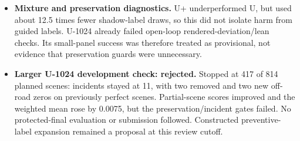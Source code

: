\begin{itemize}
\item \textbf{Mixture and preservation diagnostics.} U+ underperformed U, but used about 12.5 times fewer shadow-label draws, so this did not isolate harm from guided labels. U-1024 already failed open-loop rendered-deviation/lean checks. Its small-panel success was therefore treated as provisional, not evidence that preservation guards were unnecessary.
\item \textbf{Larger U-1024 development check: rejected.} Stopped at 417 of 814 planned scenes: incidents stayed at 11, with two removed and two new off-road zeros on previously perfect scenes. Partial-scene scores improved and the weighted mean rose by 0.0075, but the preservation/incident gates failed. No protected-final evaluation or submission followed. Constructed preventive-label expansion remained a proposal at this review cutoff.
\end{itemize}


